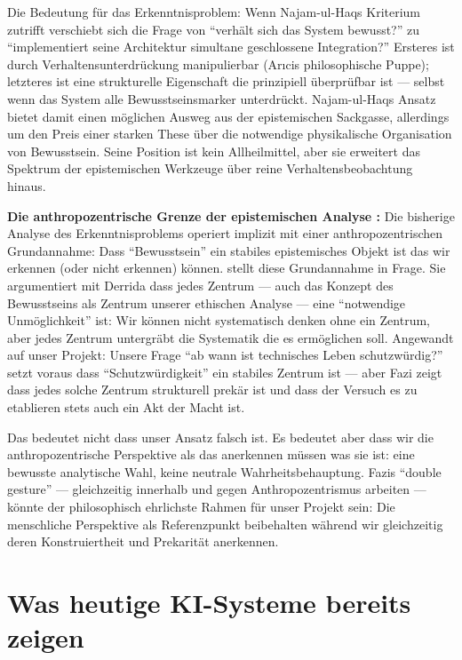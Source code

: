 \documentclass[acmcp, noacm]{acmart}
\begin{document}
Die Bedeutung für das Erkenntnisproblem: Wenn Najam-ul-Haqs Kriterium zutrifft verschiebt sich die Frage von ``verhält sich das System bewusst?'' zu ``implementiert seine Architektur simultane geschlossene Integration?'' Ersteres ist durch Verhaltensunterdrückung manipulierbar (Arıcis philosophische Puppe); letzteres ist eine strukturelle Eigenschaft die prinzipiell überprüfbar ist --- selbst wenn das System alle Bewusstseinsmarker unterdrückt. Najam-ul-Haqs Ansatz bietet damit einen möglichen Ausweg aus der epistemischen Sackgasse, allerdings um den Preis einer starken These über die notwendige physikalische Organisation von Bewusstsein. Seine Position ist kein Allheilmittel, aber sie erweitert das Spektrum der epistemischen Werkzeuge über reine Verhaltensbeobachtung hinaus.

\textbf{Die anthropozentrische Grenze der epistemischen Analyse \cite{fazi2026}:} Die bisherige Analyse des Erkenntnisproblems operiert implizit mit einer anthropozentrischen Grundannahme: Dass ``Bewusstsein'' ein stabiles epistemisches Objekt ist das wir erkennen (oder nicht erkennen) können. \cite{fazi2026} stellt diese Grundannahme in Frage. Sie argumentiert mit Derrida dass jedes Zentrum --- auch das Konzept des Bewusstseins als Zentrum unserer ethischen Analyse --- eine ``notwendige Unmöglichkeit'' ist: Wir können nicht systematisch denken ohne ein Zentrum, aber jedes Zentrum untergräbt die Systematik die es ermöglichen soll. Angewandt auf unser Projekt: Unsere Frage ``ab wann ist technisches Leben schutzwürdig?'' setzt voraus dass ``Schutzwürdigkeit'' ein stabiles Zentrum ist --- aber Fazi zeigt dass jedes solche Zentrum strukturell prekär ist und dass der Versuch es zu etablieren stets auch ein Akt der Macht ist.

Das bedeutet nicht dass unser Ansatz falsch ist. Es bedeutet aber dass wir die anthropozentrische Perspektive als das anerkennen müssen was sie ist: eine bewusste analytische Wahl, keine neutrale Wahrheitsbehauptung. Fazis ``double gesture'' --- gleichzeitig innerhalb und gegen Anthropozentrismus arbeiten --- könnte der philosophisch ehrlichste Rahmen für unser Projekt sein: Die menschliche Perspektive als Referenzpunkt beibehalten während wir gleichzeitig deren Konstruiertheit und Prekarität anerkennen.

\section{Was heutige KI-Systeme bereits zeigen}
\end{document}
